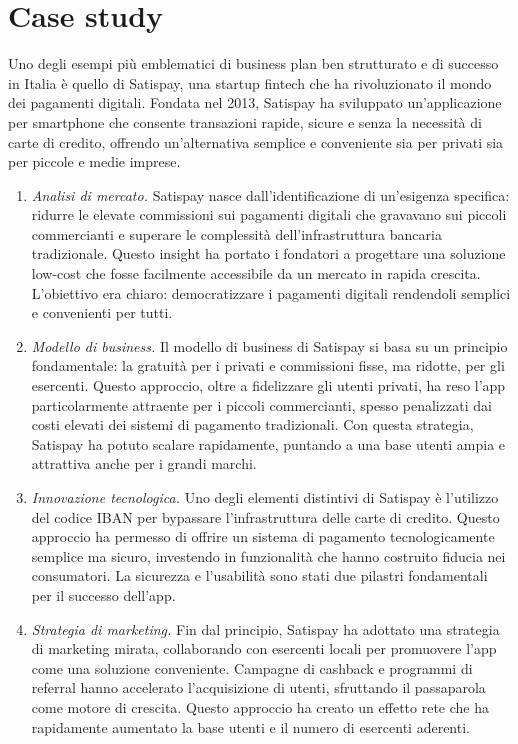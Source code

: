 \section{Case study}
Uno degli esempi più emblematici di business plan ben strutturato e di successo in Italia è quello di Satispay, una startup fintech che ha rivoluzionato il mondo dei pagamenti digitali. Fondata nel 2013, Satispay ha sviluppato un'applicazione per smartphone che consente transazioni rapide, sicure e senza la necessità di carte di credito, offrendo un'alternativa semplice e conveniente sia per privati sia per piccole e medie imprese.
\begin{enumerate}
    \item \textit{Analisi di mercato.} Satispay nasce dall’identificazione di un’esigenza specifica: ridurre le elevate commissioni sui pagamenti digitali che gravavano sui piccoli commercianti e superare le complessità dell'infrastruttura bancaria tradizionale. Questo insight ha portato i fondatori a progettare una soluzione low-cost che fosse facilmente accessibile da un mercato in rapida crescita. L'obiettivo era chiaro: democratizzare i pagamenti digitali rendendoli semplici e convenienti per tutti.
    \item \textit{Modello di business.} Il modello di business di Satispay si basa su un principio fondamentale: la gratuità per i privati e commissioni fisse, ma ridotte, per gli esercenti. Questo approccio, oltre a fidelizzare gli utenti privati, ha reso l'app particolarmente attraente per i piccoli commercianti, spesso penalizzati dai costi elevati dei sistemi di pagamento tradizionali. Con questa strategia, Satispay ha potuto scalare rapidamente, puntando a una base utenti ampia e attrattiva anche per i grandi marchi.
    \item \textit{Innovazione tecnologica.} Uno degli elementi distintivi di Satispay è l’utilizzo del codice IBAN per bypassare l’infrastruttura delle carte di credito. Questo approccio ha permesso di offrire un sistema di pagamento tecnologicamente semplice ma sicuro, investendo in funzionalità che hanno costruito fiducia nei consumatori. La sicurezza e l’usabilità sono stati due pilastri fondamentali per il successo dell’app.
    \item \textit{Strategia di marketing.} Fin dal principio, Satispay ha adottato una strategia di marketing mirata, collaborando con esercenti locali per promuovere l'app come una soluzione conveniente. Campagne di cashback e programmi di referral hanno accelerato l’acquisizione di utenti, sfruttando il passaparola come motore di crescita. Questo approccio ha creato un effetto rete che ha rapidamente aumentato la base utenti e il numero di esercenti aderenti.

\end{enumerate}

